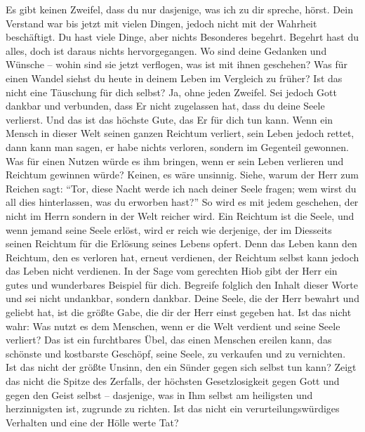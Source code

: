 Es gibt keinen Zweifel, dass du nur dasjenige, was ich zu dir spreche, hörst. Dein Verstand war bis jetzt mit vielen Dingen, jedoch nicht mit der Wahrheit beschäftigt. Du hast viele Dinge, aber nichts Besonderes begehrt. Begehrt hast du alles, doch ist daraus nichts hervorgegangen. Wo sind deine Gedanken und Wünsche -- wohin sind sie jetzt verflogen, was ist mit ihnen geschehen? Was für einen Wandel siehst du heute in deinem Leben im Vergleich zu früher? Ist das nicht eine Täuschung für dich selbst? Ja, ohne jeden Zweifel. Sei jedoch Gott dankbar und verbunden, dass Er nicht zugelassen hat, dass du deine Seele verlierst. Und das ist das höchste Gute, das Er für dich tun kann. Wenn ein Mensch in dieser Welt seinen ganzen Reichtum verliert, sein Leben jedoch rettet, dann kann man sagen, er habe nichts verloren, sondern im Gegenteil gewonnen. Was für einen Nutzen würde es ihm bringen, wenn er sein Leben verlieren und Reichtum gewinnen würde? Keinen, es wäre unsinnig. Siehe, warum der Herr zum Reichen sagt: "`Tor, diese Nacht werde ich nach deiner Seele fragen; wem wirst du all dies hinterlassen, was du erworben hast?"' So wird es mit jedem geschehen, der nicht im Herrn sondern in der Welt reicher wird. Ein Reichtum ist die Seele, und wenn jemand seine Seele erlöst, wird er reich wie derjenige, der im Diesseits seinen Reichtum für die Erlösung seines Lebens opfert. Denn das Leben kann den Reichtum, den es verloren hat, erneut verdienen, der Reichtum selbst kann jedoch das Leben nicht verdienen. In der Sage vom gerechten Hiob gibt der Herr ein gutes und wunderbares Beispiel für dich. Begreife folglich den Inhalt dieser Worte und sei nicht undankbar, sondern dankbar. Deine Seele, die der Herr bewahrt und geliebt hat, ist die größte Gabe, die dir der Herr einst gegeben hat. Ist das nicht wahr: Was nutzt es dem Menschen, wenn er die Welt verdient und seine Seele verliert? Das ist ein furchtbares Übel, das einen Menschen ereilen kann, das schönste und kostbarste Geschöpf, seine Seele, zu verkaufen und zu vernichten. Ist das nicht der größte Unsinn, den ein Sünder gegen sich selbst tun kann? Zeigt das nicht die Spitze des Zerfalls, der höchsten Gesetzlosigkeit gegen Gott und gegen den Geist selbst -- dasjenige, was in Ihm selbst am heiligsten und herzinnigsten ist, zugrunde zu richten. Ist das nicht ein verurteilungswürdiges Verhalten und eine der Hölle werte Tat? 

